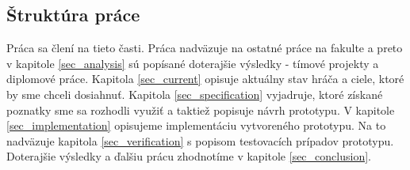 \subsection{Štruktúra práce}
Práca sa člení na tieto časti. Práca nadväzuje na ostatné práce na fakulte a preto v kapitole \ref{sec_analysis} sú popísané doterajšie výsledky - tímové projekty a diplomové práce. Kapitola \ref{sec_current} opisuje aktuálny stav hráča a ciele, ktoré by sme chceli dosiahnuť. Kapitola \ref{sec_specification} vyjadruje, ktoré získané poznatky sme sa rozhodli využiť a taktiež popisuje návrh prototypu. V kapitole \ref{sec_implementation} opisujeme implementáciu vytvoreného prototypu. Na to nadväzuje kapitola \ref{sec_verification} s popisom testovacích prípadov prototypu. Doterajšie výsledky a ďalšiu prácu zhodnotíme v kapitole \ref{sec_conclusion}.